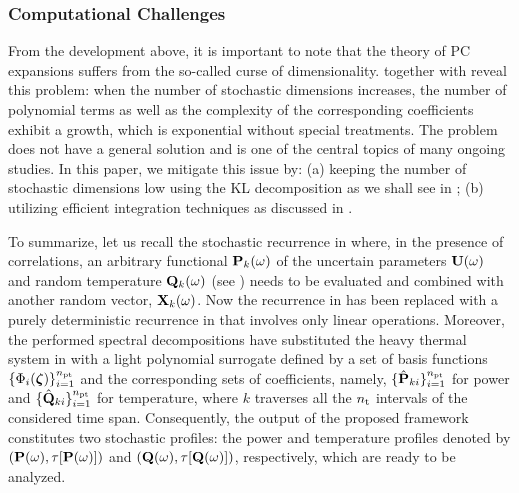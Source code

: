\subsubsection{Computational Challenges}
From the development above, it is important to note that the theory of PC expansions suffers from the so-called curse of dimensionality.
 together with  reveal this problem: when the number of stochastic dimensions increases, the number of polynomial terms as well as the complexity of the corresponding coefficients exhibit a growth, which is exponential without special treatments.
The problem does not have a general solution and is one of the central topics of many ongoing studies.
In this paper, we mitigate this issue by: (a) keeping the number of stochastic dimensions low using the KL decomposition as we shall see in ; (b) utilizing efficient integration techniques as discussed in .


To summarize, let us recall the stochastic recurrence in  where, in the presence of correlations, an arbitrary functional $\mathbf{P}_k(\omega)$ of the uncertain parameters $\mathbf{U}(\omega)$ and random temperature $\mathbf{Q}_k(\omega)$ (see ) needs to be evaluated and combined with another random vector, $\mathbf{X}_k(\omega)$.
Now the recurrence in  has been replaced with a purely deterministic recurrence in  that involves only linear operations.
Moreover, the performed spectral decompositions have substituted the heavy thermal system in  with a light polynomial surrogate defined by a set of basis functions $\{ \Phi_i(\boldsymbol{\zeta}) \}_{i = 1}^{n_\text{pt}}$ and the corresponding sets of coefficients, namely, $\{ \hat{\mathbf{P}}_{ki} \}_{i = 1}^{n_\text{pt}}$ for power and $\{ \hat{\mathbf{Q}}_{ki} \}_{i = 1}^{n_\text{pt}}$ for temperature, where $k$ traverses all the ${n_\text{t}}$ intervals of the considered time span.
Consequently, the output of the proposed framework constitutes two stochastic profiles: the power and temperature profiles denoted by $\profileP{\o}$ and $\profileT{\o}$, respectively, which are ready to be analyzed.

